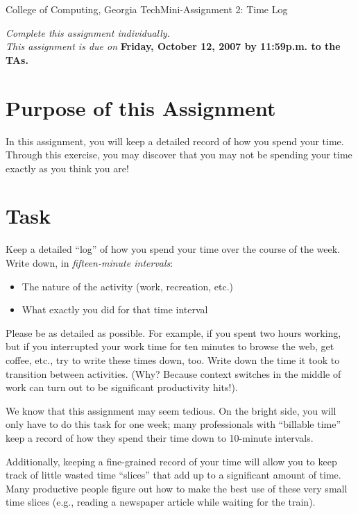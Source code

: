 \documentclass[11pt]{article}
\begin{document}


{College of Computing, Georgia Tech}{Mini-Assignment 2: Time Log}

{\em Complete this assignment individually. \\  This
  assignment is due on} {\bf Friday, October 12, 2007 by 11:59p.m. to
  the TAs.}

\section{Purpose of this Assignment}

In this assignment, you will keep a detailed record of how you spend
your time.  Through this exercise, you may discover that you may not be
spending your time exactly as you think you are!

\section{Task}

Keep a detailed ``log'' of how you spend your time over the course of
the week.  Write down, in {\em fifteen-minute intervals}:
\begin{itemize}
\item The nature of the activity (work, recreation, etc.)
\item What exactly you did for that time interval
\end{itemize}

Please be as detailed as possible.  For example, if you spent two hours
working, but if you interrupted your work time for ten minutes to browse
the web, get coffee, etc., try to write these times down, too.  Write
down the time it took to transition between activities.  (Why?  Because
context switches in the middle of work can turn out to be significant
productivity hits!).

We know that this assignment may seem tedious.  On the bright side, you
will only have to do this task for one week; many professionals with
``billable time'' keep a record of how they spend their time down to
10-minute intervals.   

Additionally, keeping a fine-grained record of your time will allow you
to keep track of little wasted time ``slices'' that add up to a
significant amount of time.  Many productive people figure out how to
make the best use of these very small time slices (e.g., reading a
newspaper article while waiting for the train).
\end{document}
